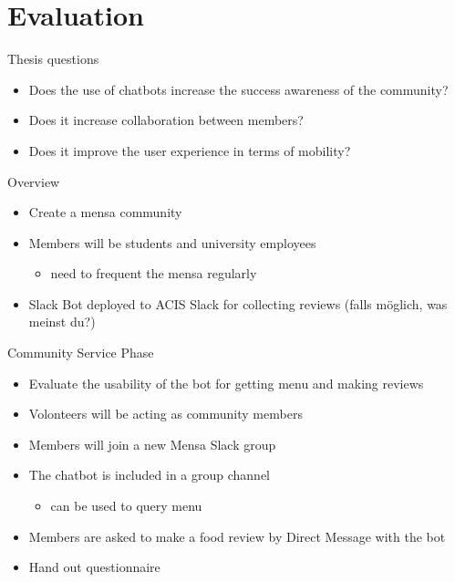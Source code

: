 \section{Evaluation}

\begin{frame}{Thesis questions}
  \begin{itemize}
    \item Does the use of chatbots increase the success awareness of the community?
    \item Does it increase collaboration between members?
    \item Does it improve the user experience in terms of mobility?
  \end{itemize}
\end{frame}

\begin{frame}{Overview}
  \begin{itemize}
    \item Create a mensa community
    \item Members will be students and university employees
          \begin{itemize}
            \item need to frequent the mensa regularly %
          \end{itemize}
    \item Slack Bot deployed to ACIS Slack for collecting reviews (falls möglich, was meinst du?)
  \end{itemize}
\end{frame}

\begin{frame}{Community Service Phase}
  \begin{itemize}
    \item Evaluate the usability of the bot for getting menu and making reviews
    \item Volonteers will be acting as community members
    \item Members will join a new Mensa Slack group
    \item The chatbot is included in a group channel
          \begin{itemize}
            \item can be used to query menu
          \end{itemize}
    \item Members are asked to make a food review by Direct Message with the bot
    \item Hand out questionnaire
  \end{itemize}
\end{frame}

